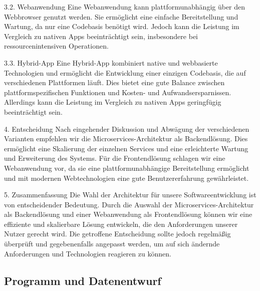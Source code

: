 3.2. Webanwendung
Eine Webanwendung kann plattformunabhängig über den Webbrowser genutzt werden. Sie ermöglicht eine einfache Bereitstellung und Wartung, da nur eine Codebasis benötigt wird. Jedoch kann die Leistung im Vergleich zu nativen Apps beeinträchtigt sein, insbesondere bei ressourcenintensiven Operationen.

3.3. Hybrid-App
Eine Hybrid-App kombiniert native und webbasierte Technologien und ermöglicht die Entwicklung einer einzigen Codebasis, die auf verschiedenen Plattformen läuft. Dies bietet eine gute Balance zwischen plattformspezifischen Funktionen und Kosten- und Aufwandsersparnissen. Allerdings kann die Leistung im Vergleich zu nativen Apps geringfügig beeinträchtigt sein.

4. Entscheidung
Nach eingehender Diskussion und Abwägung der verschiedenen Varianten empfehlen wir die Microservices-Architektur als Backendlösung. Dies ermöglicht eine Skalierung der einzelnen Services und eine erleichterte Wartung und Erweiterung des Systems. Für die Frontendlösung schlagen wir eine Webanwendung vor, da sie eine plattformunabhängige Bereitstellung ermöglicht und mit modernen Webtechnologien eine gute Benutzererfahrung gewährleistet.

5. Zusammenfassung
Die Wahl der Architektur für unsere Softwareentwicklung ist von entscheidender Bedeutung. Durch die Auswahl der Microservices-Architektur als Backendlösung und einer Webanwendung als Frontendlösung können wir eine effiziente und skalierbare Lösung entwickeln, die den Anforderungen unserer Nutzer gerecht wird. Die getroffene Entscheidung sollte jedoch regelmäßig überprüft und gegebenenfalls angepasst werden, um auf sich ändernde Anforderungen und Technologien reagieren zu können.

\subsection{Programm und Datenentwurf}
\label{sec:ProgrammUDatenentwurf}